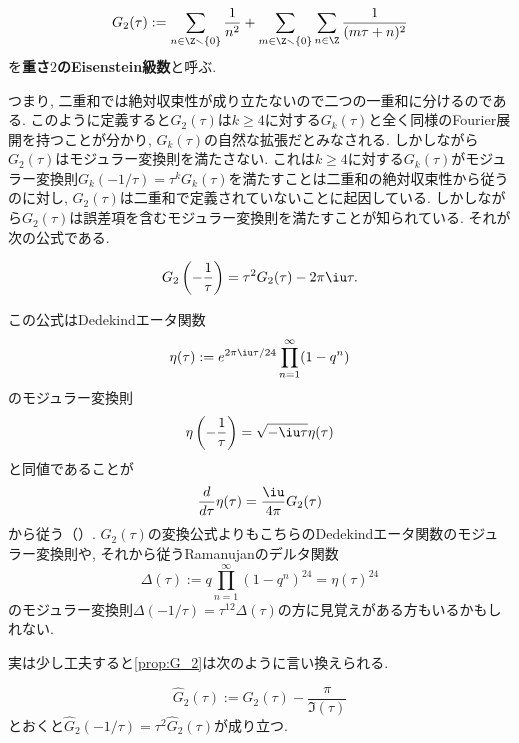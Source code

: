 \documentclass[11pt,b5paper,oneside,lualatex]{ltjsarticle} %
\numberwithin{equation}{section} %
\begin{document}
\begin{dfn}
	\[
	G_2 (\tau) := 
	\sum_{n \in \Z \smallsetminus \{ 0 \}} \frac{1}{n^2} 
	+ \sum_{m \in \Z \smallsetminus \{ 0 \}} \sum_{n \in \Z} \frac{1}{(m\tau + n)^2}
	\]
	を\textbf{重さ$ 2 $のEisenstein級数}と呼ぶ. 
\end{dfn}

つまり, 二重和では絶対収束性が成り立たないので二つの一重和に分けるのである. 
このように定義すると$ G_2 (\tau) $は$ k \ge 4 $に対する$ G_k (\tau) $と全く同様のFourier展開を持つことが分かり, $ G_k (\tau) $の自然な拡張だとみなされる. 
しかしながら$ G_2 (\tau) $はモジュラー変換則を満たさない. 
これは$ k \ge 4 $に対する$ G_k (\tau) $がモジュラー変換則$ G_k (-1/\tau) = \tau^k G_k(\tau) $を満たすことは二重和の絶対収束性から従うのに対し, $ G_2 (\tau) $は二重和で定義されていないことに起因している. 
しかしながら$ G_2 (\tau) $は誤差項を含むモジュラー変換則を満たすことが知られている. 
それが次の公式である. 

\begin{prop}
	\label{prop:G_2}
	\[
	G_2 \left( -\frac{1}{\tau} \right) = \tau^2 G_2(\tau) - 2\pi \iu \tau.
	\]
\end{prop}

\begin{rem}
	この公式はDedekindエータ関数
	\[
	\eta(\tau) := e^{2\pi\iu\tau/24}
	\prod_{n=1}^{\infty} (1-q^n)
	\]
	のモジュラー変換則
	\[
	\eta \left( -\frac{1}{\tau} \right)
	=
	\sqrt{-\iu \tau} \eta (\tau)
	\]
	と同値であることが
	\[
	\frac{d}{d\tau} \eta(\tau)
	=
	\frac{\iu}{4\pi} G_2(\tau)
	\]
	から従う（\cite[Proposition 1.2.5]{DS}）. 
	$ G_2 (\tau) $の変換公式よりもこちらのDedekindエータ関数のモジュラー変換則や, それから従うRamanujanのデルタ関数
	\[
	\Delta(\tau) := q \prod_{n=1}^{\infty} (1-q^n)^{24}
	= \eta(\tau)^{24}
	\]
	のモジュラー変換則$ \Delta(-1/\tau) = \tau^{12} \Delta(\tau) $の方に見覚えがある方もいるかもしれない. 
\end{rem}

実は少し工夫すると\cref{prop:G_2}は次のように言い換えられる. 

\begin{prop}
	\label{prop:G_2_completion}
	\[
	\widehat{G}_2 (\tau) := G_2(\tau) - \frac{\pi }{\Im (\tau)}
	\]
	とおくと$ \widehat{G}_2 (-1/\tau) = \tau^2 \widehat{G}_2 (\tau) $が成り立つ.
\end{prop}
\end{document}
